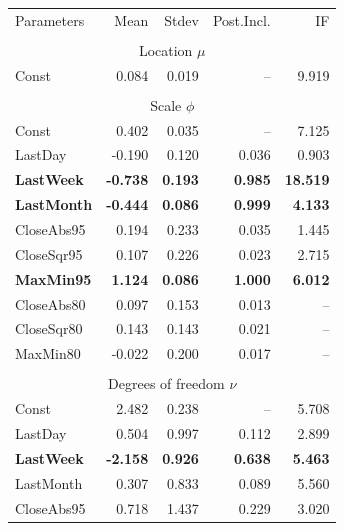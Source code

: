 \documentclass[10pt]{beamer}
\begin{document}
\begin{frame}[plain]
\tiny{ 
\begin{table}  
\begin{centering}
\begin{tabular}{lrrrr}
 &  &  &  & \tabularnewline
\hline
\hline 
Parameters  & Mean  & Stdev  & Post.Incl.  & IF \tabularnewline
\hline 
 &  &  &  & \tabularnewline
\multicolumn{5}{c}{Location $\mu$}\tabularnewline
\hline
Const & \multicolumn{1}{r}{0.084} & \multicolumn{1}{r}{0.019} & \multicolumn{1}{r}{--} & \multicolumn{1}{r}{9.919}\tabularnewline
 &  & \multicolumn{1}{c}{} &  & \tabularnewline
\multicolumn{5}{c}{Scale $\phi$}\tabularnewline
\hline
Const & \multicolumn{1}{r}{0.402} & \multicolumn{1}{r}{0.035} & \multicolumn{1}{r}{--} & \multicolumn{1}{r}{7.125}\tabularnewline
LastDay  & \multicolumn{1}{r}{-0.190} & \multicolumn{1}{r}{0.120} & \multicolumn{1}{r}{0.036} & \multicolumn{1}{r}{0.903}\tabularnewline
\textbf{LastWeek} & \multicolumn{1}{r}{\textbf{-0.738}} & \multicolumn{1}{r}{\textbf{0.193}} & \multicolumn{1}{r}{\textbf{0.985}} & \multicolumn{1}{r}{\textbf{18.519 }}\tabularnewline
\textbf{LastMonth} & \multicolumn{1}{r}{\textbf{ -0.444}} & \multicolumn{1}{r}{\textbf{0.086}} & \multicolumn{1}{r}{\textbf{0.999}} & \multicolumn{1}{r}{\textbf{4.133}}\tabularnewline
CloseAbs95 & \multicolumn{1}{r}{0.194} & \multicolumn{1}{r}{0.233 } & \multicolumn{1}{r}{0.035 } & \multicolumn{1}{r}{1.445}\tabularnewline
CloseSqr95 & \multicolumn{1}{r}{ 0.107 } & \multicolumn{1}{r}{0.226 } & \multicolumn{1}{r}{0.023} & \multicolumn{1}{r}{2.715}\tabularnewline
\textbf{MaxMin95} & \multicolumn{1}{r}{\textbf{1.124}} & \multicolumn{1}{r}{\textbf{ 0.086 }} & \multicolumn{1}{r}{\textbf{1.000 }} & \multicolumn{1}{r}{\textbf{6.012}}\tabularnewline
CloseAbs80 & \multicolumn{1}{r}{ 0.097 } & \multicolumn{1}{r}{ 0.153 } & \multicolumn{1}{r}{0.013} & \multicolumn{1}{r}{--}\tabularnewline
CloseSqr80 & \multicolumn{1}{r}{ 0.143} & \multicolumn{1}{r}{ 0.143} & \multicolumn{1}{r}{0.021} & \multicolumn{1}{r}{--}\tabularnewline
MaxMin80 & \multicolumn{1}{r}{ -0.022 } & \multicolumn{1}{r}{ 0.200} & \multicolumn{1}{r}{0.017 } & \multicolumn{1}{r}{--}\tabularnewline
 &  &  &  & \tabularnewline
\multicolumn{5}{c}{Degrees of freedom $\nu$}\tabularnewline
\hline
Const & 2.482  & 0.238 & -- & 5.708\tabularnewline
LastDay  & 0.504 & 0.997 & 0.112 & 2.899\tabularnewline
\textbf{LastWeek} & \textbf{-2.158} & \textbf{ 0.926} & \textbf{0.638} & \textbf{5.463}\tabularnewline
LastMonth &  0.307 & 0.833  & 0.089 & 5.560\tabularnewline
CloseAbs95 &  0.718 &  1.437 & 0.229 & 3.020\tabularnewline

\end{tabular}
\end{centering}
\end{table}}
\end{frame}
\end{document}
